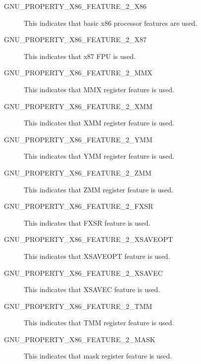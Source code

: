 \begin{description}
 \item[GNU_PROPERTY_X86_FEATURE_2_X86] This indicates that basic x86
   processor features are used.
 \item[GNU_PROPERTY_X86_FEATURE_2_X87] This indicates that x87 FPU is
   used.
 \item[GNU_PROPERTY_X86_FEATURE_2_MMX] This indicates that MMX register
   feature is used.
 \item[GNU_PROPERTY_X86_FEATURE_2_XMM] This indicates that XMM register
   feature is used.
 \item[GNU_PROPERTY_X86_FEATURE_2_YMM] This indicates that YMM register
   feature is used.
 \item[GNU_PROPERTY_X86_FEATURE_2_ZMM] This indicates that ZMM register
   feature is used.
 \item[GNU_PROPERTY_X86_FEATURE_2_FXSR] This indicates that FXSR feature
   is used.
 \item[GNU_PROPERTY_X86_FEATURE_2_XSAVEOPT] This indicates that XSAVEOPT
   feature is used.
 \item[GNU_PROPERTY_X86_FEATURE_2_XSAVEC] This indicates that XSAVEC
   feature is used.
 \item[GNU_PROPERTY_X86_FEATURE_2_TMM] This indicates that TMM register
   feature is used.
 \item[GNU_PROPERTY_X86_FEATURE_2_MASK] This indicates that mask register
   feature is used.
\end{description}

